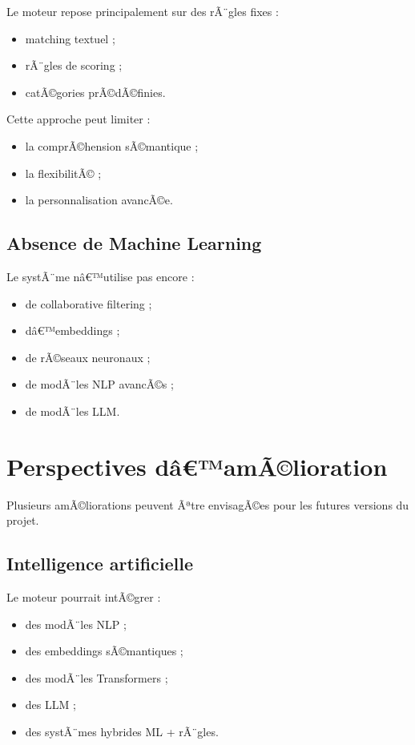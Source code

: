 ﻿\documentclass[12pt,a4paper]{report}
\begin{document}
Le moteur repose principalement sur des rÃ¨gles fixes :
\begin{itemize}
    \item matching textuel ;
    \item rÃ¨gles de scoring ;
    \item catÃ©gories prÃ©dÃ©finies.
\end{itemize}

Cette approche peut limiter :
\begin{itemize}
    \item la comprÃ©hension sÃ©mantique ;
    \item la flexibilitÃ© ;
    \item la personnalisation avancÃ©e.
\end{itemize}

\subsection{Absence de Machine Learning}

Le systÃ¨me nâ€™utilise pas encore :
\begin{itemize}
    \item de collaborative filtering ;
    \item dâ€™embeddings ;
    \item de rÃ©seaux neuronaux ;
    \item de modÃ¨les NLP avancÃ©s ;
    \item de modÃ¨les LLM.
\end{itemize}

\section{Perspectives dâ€™amÃ©lioration}

Plusieurs amÃ©liorations peuvent Ãªtre envisagÃ©es pour les futures versions du projet.

\subsection{Intelligence artificielle}

Le moteur pourrait intÃ©grer :
\begin{itemize}
    \item des modÃ¨les NLP ;
    \item des embeddings sÃ©mantiques ;
    \item des modÃ¨les Transformers ;
    \item des LLM ;
    \item des systÃ¨mes hybrides ML + rÃ¨gles.
\end{itemize}
\end{document}
